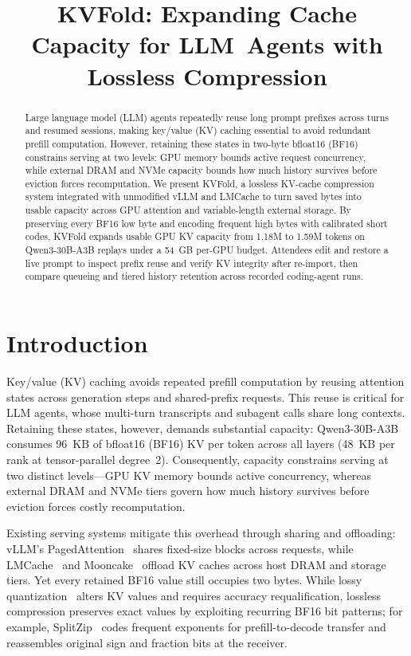 \documentclass[conference]{IEEEtran}
\title{KVFold: Expanding Cache Capacity for \mbox{LLM Agents} with Lossless Compression}
\author{\IEEEauthorblockN{Working draft}
\IEEEauthorblockA{Author information to be supplied}}
\begin{document}
\maketitle

\begin{abstract}
Large language model (LLM) agents repeatedly reuse long prompt prefixes across
turns and resumed sessions, making key/value (KV) caching essential to avoid
redundant prefill computation. However, retaining these states in two-byte
bfloat16 (BF16) constrains serving at two levels: GPU memory bounds active
request concurrency, while external DRAM and NVMe capacity bounds how much
history survives before eviction forces recomputation. We present KVFold, a
lossless KV-cache compression system integrated with unmodified vLLM and
LMCache to turn saved bytes into usable capacity across GPU attention and
variable-length external storage. By preserving every BF16 low byte and
encoding frequent high bytes with calibrated short codes, KVFold expands
usable GPU KV capacity from 1.18M to 1.59M tokens on Qwen3-30B-A3B replays
under a 54~GB per-GPU budget. Attendees edit and restore a live prompt to
inspect prefix reuse and verify KV integrity after re-import, then compare
queueing and tiered history retention across recorded coding-agent runs.
\end{abstract}

\section{Introduction}
Key/value (KV) caching avoids repeated prefill computation by reusing attention
states across generation steps and shared-prefix requests. This reuse is
critical for LLM agents, whose multi-turn transcripts and subagent calls share
long contexts. Retaining these states, however, demands substantial capacity:
Qwen3-30B-A3B consumes 96~KB of bfloat16 (BF16) KV per token across all layers
(48~KB per rank at tensor-parallel degree~2). Consequently, capacity constrains
serving at two distinct levels---GPU KV memory bounds active concurrency,
whereas external DRAM and NVMe tiers govern how much history survives before
eviction forces costly recomputation.

Existing serving systems mitigate this overhead through sharing and offloading:
vLLM's PagedAttention~\cite{vllm} shares fixed-size blocks across requests,
while LMCache~\cite{lmcache} and Mooncake~\cite{mooncake} offload KV caches
across host DRAM and storage tiers. Yet every retained
BF16 value still occupies two bytes. While lossy quantization~\cite{kivi}
alters KV values and requires accuracy requalification, lossless compression
preserves exact values by exploiting recurring BF16 bit patterns; for example,
SplitZip~\cite{splitzip} codes frequent exponents for prefill-to-decode
transfer and reassembles original sign and fraction bits at the receiver.
\end{document}
